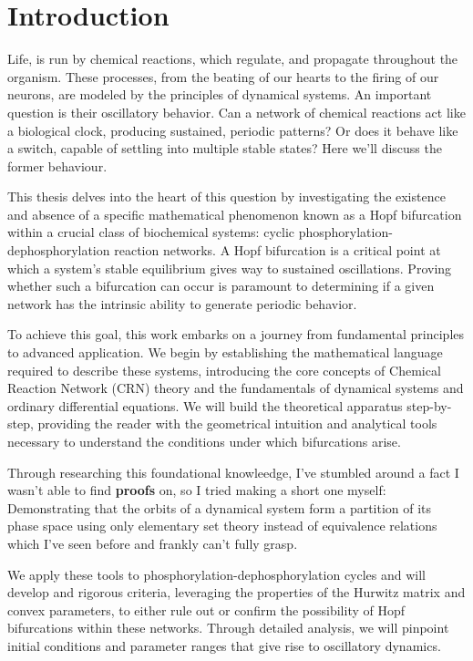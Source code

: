 \chapter{Introduction}

\label{intro}

Life, is run by chemical reactions, which regulate, and propagate throughout the organism. These processes, from the beating of our hearts to the firing of our neurons, are modeled by the principles of dynamical systems. An important question is their oscillatory behavior. Can a network of chemical reactions act like a biological clock, producing sustained, periodic patterns? Or does it behave like a switch, capable of settling into multiple stable states? Here we'll discuss the former behaviour.

This thesis delves into the heart of this question by investigating the existence and absence of a specific mathematical phenomenon known as a Hopf bifurcation within a crucial class of biochemical systems: cyclic phosphorylation-dephosphorylation reaction networks. A Hopf bifurcation is a critical point at which a system's stable equilibrium gives way to sustained oscillations. Proving whether such a bifurcation can occur is paramount to determining if a given network has the intrinsic ability to generate periodic behavior.

To achieve this goal, this work embarks on a journey from fundamental principles to advanced application. We begin by establishing the mathematical language required to describe these systems, introducing the core concepts of Chemical Reaction Network (CRN) theory and the fundamentals of dynamical systems and ordinary differential equations. We will build the theoretical apparatus step-by-step, providing the reader with the geometrical intuition and analytical tools necessary to understand the conditions under which bifurcations arise.

Through researching this foundational knowleedge, I've stumbled around a fact I wasn't able to find \textbf{ proofs } on, so I tried making a short one myself: Demonstrating that the orbits of a dynamical system form a partition of its phase space using only elementary set theory instead of equivalence relations which I've seen before and frankly can't fully grasp.

We apply these tools to phosphorylation-dephosphorylation cycles and will develop and rigorous criteria, leveraging the properties of the Hurwitz matrix and convex parameters, to either rule out or confirm the possibility of Hopf bifurcations within these networks. Through detailed analysis, we will pinpoint initial conditions and parameter ranges that give rise to oscillatory dynamics.

